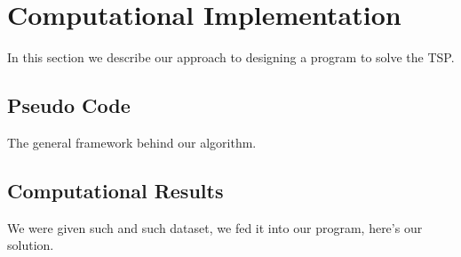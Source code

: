 \section{Computational Implementation}
In this section we describe our approach to designing a program to solve the TSP.

\subsection{Pseudo Code}
The general framework behind our algorithm.

\subsection{Computational Results}
We were given such and such dataset, we fed it into our program, here's our solution.
